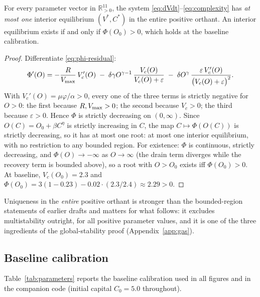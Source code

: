\begin{theorem}
\label{thm:uniqueness}
For every parameter vector in $\mathbb{R}^{11}_{>0}$, the system
\eqref{eq:dVdt}--\eqref{eq:complexity} has \emph{at most one} interior
equilibrium $(V^{*},C^{*})$ in the entire positive orthant. An interior
equilibrium exists if and only if $\Phi(O_0)>0$, which holds at the baseline
calibration.
\end{theorem}

\begin{proof}
Differentiate \eqref{eq:phi-residual}:
\[
\Phi'(O)
= -\frac{R}{V_{\max}}\,V_c'(O)
\;-\;\delta\gamma O^{\gamma-1}\,\frac{V_c(O)}{V_c(O)+\varepsilon}
\;-\;\delta O^{\gamma}\,\frac{\varepsilon\,V_c'(O)}{\bigl(V_c(O)+\varepsilon\bigr)^{2}} .
\]
With $V_c'(O)=\mu\varphi/\alpha>0$, every one of the three terms is strictly
negative for $O>0$: the first because $R,V_{\max}>0$; the second because
$V_c>0$; the third because $\varepsilon>0$. Hence $\Phi$ is strictly
decreasing on $(0,\infty)$. Since $O(C)=O_0+\beta C^{\eta}$ is strictly
increasing in $C$, the map $C\mapsto\Phi(O(C))$ is strictly decreasing, so it
has at most one root: at most one interior equilibrium, with no restriction
to any bounded region. For existence: $\Phi$ is continuous, strictly
decreasing, and $\Phi(O)\to-\infty$ as $O\to\infty$ (the drain term diverges
while the recovery term is bounded above), so a root with $O>O_0$ exists iff
$\Phi(O_0)>0$. At baseline, $V_c(O_0)=2.3$ and
$\Phi(O_0)=3(1-0.23)-0.02\cdot(2.3/2.4)\approx 2.29>0$.
\end{proof}

Uniqueness in the \emph{entire} positive orthant is stronger than the
bounded-region statements of earlier drafts and matters for what follows: it
excludes multistability outright, for all positive parameter values, and it
is one of the three ingredients of the global-stability proof
(Appendix~\ref{app:gas}).

\subsection{Baseline calibration}
\label{sec:calibration}

Table~\ref{tab:parameters} reports the baseline calibration used in all
figures and in the companion code (initial capital $C_0=5.0$ throughout).

